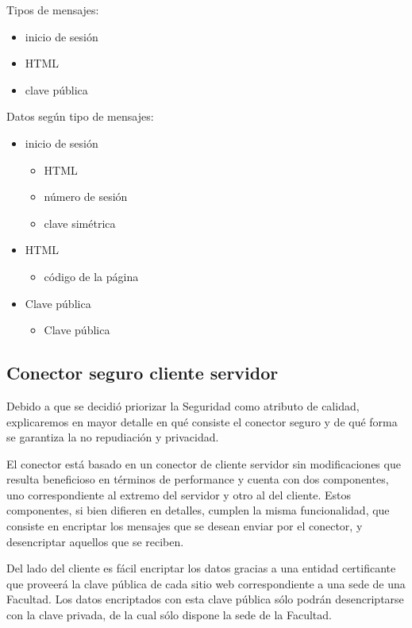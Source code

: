 Tipos de mensajes:
\begin{itemize}
 \item inicio de sesión
 \item HTML
 \item clave pública
\end{itemize}


Datos según tipo de mensajes:
\begin{itemize}
 \item inicio de sesión
 \begin{itemize}
  \item HTML
  \item número de sesión
  \item clave simétrica
 \end{itemize}
 \item HTML
  \begin{itemize}
   \item código de la página
  \end{itemize}

 \item Clave pública
  \begin{itemize}
   \item Clave pública
  \end{itemize}
\end{itemize}


\subsection{Conector seguro cliente servidor}

Debido a que se decidió priorizar la Seguridad como atributo de calidad, explicaremos en mayor detalle en qué consiste el conector seguro y de qué forma se garantiza la no repudiación y privacidad.

El conector está basado en un conector de cliente servidor sin modificaciones que resulta beneficioso en términos de performance y cuenta con dos componentes, uno correspondiente al extremo del servidor y otro al del cliente. 
Estos componentes, si bien difieren en detalles, cumplen la misma funcionalidad, que consiste en encriptar los mensajes que se desean enviar por el conector, y desencriptar aquellos que se reciben.


Del lado del cliente es fácil encriptar los datos gracias a una entidad certificante que proveerá la clave pública de cada sitio web correspondiente a una sede de una Facultad. Los datos encriptados con esta clave pública sólo podrán desencriptarse con la clave privada, de la cual sólo dispone la sede de la Facultad.


